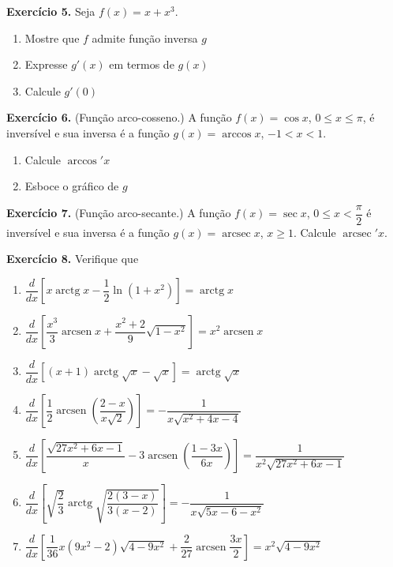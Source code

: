 \documentclass[12pt,a4paper]{article}
\begin{document}
\vspace{0.5cm}
\noindent\textbf{Exercício 5.} Seja $f(x) = x + x^3$.
\begin{enumerate}
    \renewcommand{\theenumi}{\alph{enumi}}
    \renewcommand{\labelenumi}{\theenumi)}
    \item Mostre que $f$ admite função inversa $g$
    \item Expresse $g'(x)$ em termos de $g(x)$
    \item Calcule $g'(0)$
\end{enumerate}

\vspace{0.5cm}
\noindent\textbf{Exercício 6.}
(Função arco-cosseno.) A função $f(x) = \cos x$, $0 \le x \le \pi$, é inversível e sua inversa é a função $g(x) = \arccos x$, $-1 < x < 1$.
\begin{enumerate}
    \renewcommand{\theenumi}{\alph{enumi}}
    \renewcommand{\labelenumi}{\theenumi)}
    \item Calcule $\arccos' x$
    \item Esboce o gráfico de $g$
\end{enumerate}

\vspace{0.5cm}
\noindent\textbf{Exercício 7.}
(Função arco-secante.) A função $f(x) = \sec x$, $0 \le x < \dfrac{\pi}{2}$ é inversível e sua inversa é a função $g(x) = \operatorname{arcsec} x$, $x \ge 1$. Calcule $\operatorname{arcsec}' x$.

\vspace{0.5cm}
\noindent\textbf{Exercício 8.} Verifique que
\begin{enumerate}
    \renewcommand{\theenumi}{\alph{enumi}}
    \renewcommand{\labelenumi}{\theenumi)}
    \item $\dfrac{d}{dx}\!\left[x\operatorname{arctg} x - \dfrac{1}{2}\ln(1 + x^2)\right] = \operatorname{arctg} x$
    \item $\dfrac{d}{dx}\!\left[\dfrac{x^3}{3}\operatorname{arcsen} x + \dfrac{x^2 + 2}{9}\sqrt{1 - x^2}\right] = x^2 \operatorname{arcsen} x$
    \item $\dfrac{d}{dx}\left[(x + 1)\operatorname{arctg}\sqrt{x} - \sqrt{x}\right] = \operatorname{arctg}\sqrt{x}$
    \item $\dfrac{d}{dx}\left[\dfrac{1}{2}\operatorname{arcsen}\left(\dfrac{2 - x}{x\sqrt{2}}\right)\right] = -\dfrac{1}{x\sqrt{x^2 + 4x - 4}}$
    \item $\dfrac{d}{dx}\left[\dfrac{\sqrt{27x^2 + 6x - 1}}{x} - 3\operatorname{arcsen}\left(\dfrac{1 - 3x}{6x}\right)\right] = \dfrac{1}{x^2 \sqrt{27x^2 + 6x - 1}}$
    \item $\dfrac{d}{dx}\left[\sqrt{\dfrac{2}{3}}\operatorname{arctg}\sqrt{\dfrac{2(3 - x)}{3(x - 2)}}\right] = -\dfrac{1}{x\sqrt{5x - 6 - x^2}}$
    \item $\dfrac{d}{dx}\left[\dfrac{1}{36}x(9x^2 - 2)\sqrt{4 - 9x^2} + \dfrac{2}{27}\operatorname{arcsen}\dfrac{3x}{2}\right] = x^2 \sqrt{4 - 9x^2}$
\end{enumerate}
\end{document}
